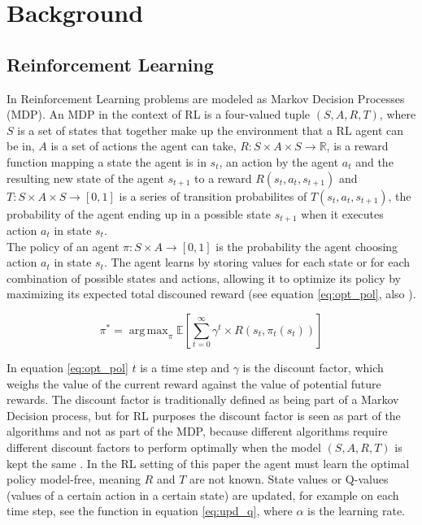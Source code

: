 
\section{Background}

\subsection{Reinforcement Learning}

In Reinforcement Learning problems are modeled as Markov Decision Processes (MDP). An MDP in the context of RL
is a four-valued tuple $(S,A,R,T)$, where $S$ is a set of states that together make up the environment that a RL agent can be in,
 $A$ is a set of actions the agent can take, $R: S \times A \times S \rightarrow \mathbb{R}$, is a reward function mapping a state the agent is in $s_t$,
 an action by the agent $a_t$ and the resulting new state of the agent $s_{t+1}$ to a reward $R(s_t,a_t,s_{t+1})$
 and $T: S \times A \times S \rightarrow [0,1]$ is a series of transition probabilites of $T(s_t,a_t,s_{t+1})$, the probability of the agent
 ending up in a possible state $s_{t+1}$ when it executes action $a_t$ in state $s_t$. \\
 The policy of an agent $\pi: S \times A \rightarrow [0,1]$ is the probability the agent choosing action $a_t$ in state $s_t$. The agent learns by storing values for each
 state or for each combination of possible states and actions, allowing it to optimize its policy by maximizing its expected total discouned reward
 (see equation \ref{eq:opt_pol}, also \cite{zimmer2016neural}).

\begin{equation}
\label{eq:opt_pol}
\pi^* = \operatorname{arg\,max}_{\pi} \mathbb{E}\left [ \sum_{t = 0}^{\infty}\gamma^{t} \times R(s_t,\pi_t(s_t))\right ]
\end{equation}

In equation \eqref{eq:opt_pol} $t$ is a time step and $\gamma$ is the discount factor, which weighs the value of the current reward against the value of potential future rewards.
The discount factor is traditionally defined as being part of a Markov Decision process, but for RL purposes the discount factor is seen as part
of the algorithms and not as part of the MDP, because different algorithms require different discount factors to perform optimally when the model
$(S,A,R,T)$ is kept the same \cite{van2007reinforcement}. In the RL setting of this paper the agent must learn the optimal policy model-free, meaning $R$ and $T$ are not known.
State values or Q-values (values of a certain action in a certain state) are updated, for example on each time step, see the function in equation \ref{eq:upd_q}, where $\alpha$ is the learning rate.

